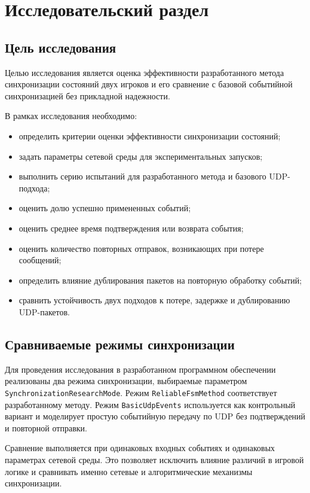 \chapter{Исследовательский раздел}\label{research}

\section{Цель исследования}

Целью исследования является оценка эффективности разработанного метода синхронизации состояний двух игроков и его сравнение с базовой событийной синхронизацией без прикладной надежности.

В рамках исследования необходимо:
\begin{itemize}
	\item определить критерии оценки эффективности синхронизации состояний;
	\item задать параметры сетевой среды для экспериментальных запусков;
	\item выполнить серию испытаний для разработанного метода и базового UDP-подхода;
	\item оценить долю успешно примененных событий;
	\item оценить среднее время подтверждения или возврата события;
	\item оценить количество повторных отправок, возникающих при потере сообщений;
	\item определить влияние дублирования пакетов на повторную обработку событий;
	\item сравнить устойчивость двух подходов к потере, задержке и дублированию UDP-пакетов.
\end{itemize}

\section{Сравниваемые режимы синхронизации}

Для проведения исследования в разработанном программном обеспечении реализованы два режима синхронизации, выбираемые параметром \texttt{SynchronizationResearchMode}. Режим \texttt{ReliableFsmMethod} соответствует разработанному методу. Режим \texttt{BasicUdpEvents} используется как контрольный вариант и моделирует простую событийную передачу по UDP без подтверждений и повторной отправки.

Сравнение выполняется при одинаковых входных событиях и одинаковых параметрах сетевой среды. Это позволяет исключить влияние различий в игровой логике и сравнивать именно сетевые и алгоритмические механизмы синхронизации.

